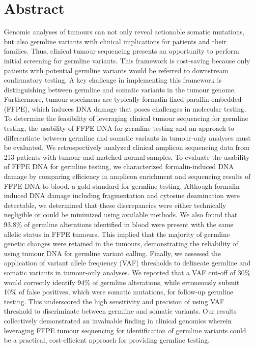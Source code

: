 
\chapter{Abstract}

Genomic analyses of tumours can not only reveal actionable somatic mutations, but also germline variants with clinical implications for patients and their families. Thus, clinical tumour sequencing presents an opportunity to perform initial screening for germline variants. This framework is cost-saving because only patients with potential germline variants would be referred to downstream confirmatory testing. A key challenge in implementing this framework is distinguishing between germline and somatic variants in the tumour genome. Furthermore, tumour specimens are typically formalin-fixed paraffin-embedded (FFPE), which induces DNA damage that poses challenges in molecular testing. To determine the feasibility of leveraging clinical tumour sequencing for germline testing, the usability of FFPE DNA for germline testing and an approach to differentiate between germline and somatic variants in tumour-only analyses must be evaluated. We retrospectively analyzed clinical amplicon sequencing data from 213 patients with tumour and matched normal samples. To evaluate the usability of FFPE DNA for germline testing, we characterized formalin-induced DNA damage by comparing efficiency in amplicon enrichment and sequencing results of FFPE DNA to blood, a gold standard for germline testing. Although formalin-induced DNA damage including fragmentation and cytosine deamination were detectable, we determined that these discrepancies were either technically negligible or could be minimized using available methods. We also found that 93.8\% of germline alterations identified in blood were present with the same allelic status in FFPE tumours. This implied that the majority of germline genetic changes were retained in the tumours, demonstrating the reliability of using tumour DNA for germline variant calling. Finally, we assessed the application of variant allele frequency (VAF) thresholds to delineate germline and somatic variants in tumour-only analyses. We reported that a VAF cut-off of 30\% would correctly identify 94\% of germline alterations, while erroneously submit 10\% of false positives, which were somatic mutations, for follow-up germline testing. This underscored the high sensitivity and precision of using VAF threshold to discriminate between germline and somatic variants. Our results collectively demonstrated an invaluable finding in clinical genomics wherein leveraging FFPE tumour sequencing for identification of germline variants could be a practical, cost-efficient approach for providing germline testing.

